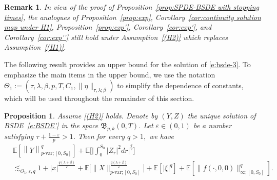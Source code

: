 \documentclass[11pt,reqno]{amsart}
\def\E{\mathbb E}
\newtheorem{remark}{Remark}[section]
\newtheorem{proposition}{Proposition}[section]
\numberwithin{equation}{section}
\begin{document}
\begin{remark}\label{rem:stopping times}
In view of the proof of Proposition~\ref{prop:SPDE-BSDE with stopping times}, the analogues of Proposition~\ref{prop:exp}, Corollary~\ref{cor:continuity solution map under H1}, Proposition~\ref{prop:exp'}, Corollary~\ref{cor:exp'}, and Corollary~\ref{cor:exp''} still hold under Assumption~\ref{(H2)} which replaces Assumption~\ref{(H1)}.
\end{remark}

The following result provides an upper bound for the solution of \eqref{e:bsde-3}. To emphasize the main items in the upper bound, we use the notation $\Theta_{1}:=(\tau,\lambda,\beta,p,T,C_{1},\|\eta\|_{\tau,\lambda;\beta})$ to simplify the dependence of constants, which will be used throughout the remainder of this section.



\begin{proposition}\label{prop:SPDE-estimate for Gamma} 
Assume \ref{(H2)} holds. Denote by $(Y,Z)$ the unique solution of BSDE~\eqref{e:BSDE'} in the space $\mathfrak{B}_{p,k}(0,T)$.  Let $\varepsilon\in(0,1)$ be a number satisfying $\tau + \frac{1-\varepsilon}{p}>1$.
Then for every $q>1,$ we have 
\begin{equation}\label{e:bound-Y}
\begin{aligned}
&\mathbb{E}\left[\left\|Y\right\|^{q}_{p\text{-}\mathrm{var};[0,S_{0}]}\right] + \E\bigg[ \Big|\int_{0}^{S_0} |Z_r|^2 dr\Big|^{\frac{q}2}\bigg] \\
&\lesssim_{\Theta_{1},\varepsilon,q} 1 + |x|^{\frac{q(\lambda+\beta)}{\varepsilon}} + \mathbb{E}\Big[\|X\|^{\frac{q(\lambda + \beta)}{\varepsilon}}_{p\text{-}\mathrm{var};[0,S_{0}]}\Big] + \E[|\xi|^q] + \mathbb{E}\left[\|f(\cdot,0,0)\|^{q}_{\infty;[0,S_{0}]}\right].
\end{aligned}
\end{equation}
\end{proposition}		
\end{document}
